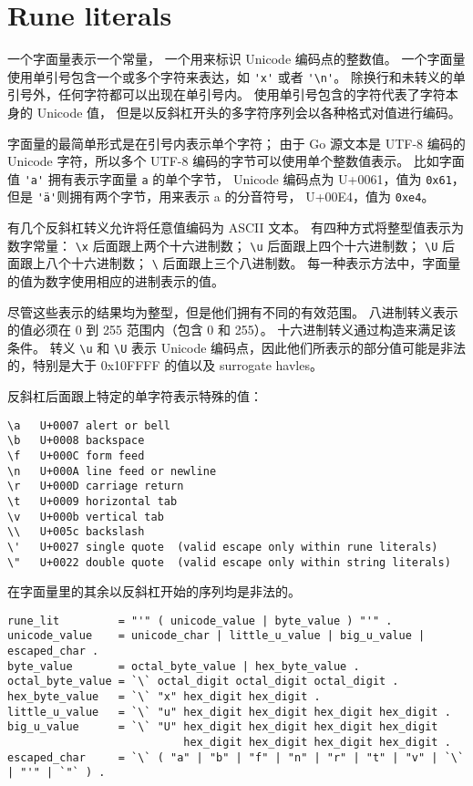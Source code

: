 

\section{Rune literals}
一个\rune{}字面量表示一个\rune{}常量，
一个用来标识 Unicode 编码点的整数值。
一个\rune{}字面量使用单引号包含一个或多个字符来表达，如 \lstinline|'x'| 或者 \lstinline|'\n'|。
除换行和未转义的单引号外，任何字符都可以出现在单引号内。
使用单引号包含的字符代表了字符本身的 Unicode 值，
但是以反斜杠开头的多字符序列会以各种格式对值进行编码。

\rune{}字面量的最简单形式是在引号内表示单个字符；
由于 Go 源文本是 UTF-8 编码的 Unicode 字符，所以多个 UTF-8 编码的字节可以使用单个整数值表示。
比如字面值 \lstinline|'a'| 拥有表示字面量 \lstinline|a| 的单个字节，
Unicode 编码点为 U+0061，值为 \lstinline|0x61|，但是 \lstinline|'ä'|则拥有两个字节，用来表示 a 的分音符号，
U+00E4，值为 \lstinline|0xe4|。

有几个反斜杠转义允许将任意值编码为 ASCII 文本。
有四种方式将整型值表示为数字常量：
\lstinline|\x| 后面跟上两个十六进制数；
\lstinline|\u| 后面跟上四个十六进制数；
\lstinline|\U| 后面跟上八个十六进制数；
\lstinline|\|  后面跟上三个八进制数。
每一种表示方法中，字面量的值为数字使用相应的进制表示的值。

尽管这些表示的结果均为整型，但是他们拥有不同的有效范围。
八进制转义表示的值必须在 0 到 255 范围内（包含 0 和 255）。
十六进制转义通过构造来满足该条件。%
转义 \lstinline|\u| 和 \lstinline|\U| 表示 Unicode 编码点，因此他们所表示的部分值可能是非法的，特别是大于 0x10FFFF 的值以及 surrogate havles。

反斜杠后面跟上特定的单字符表示特殊的值：
\begin{lstlisting}
\a   U+0007 alert or bell
\b   U+0008 backspace
\f   U+000C form feed
\n   U+000A line feed or newline
\r   U+000D carriage return
\t   U+0009 horizontal tab
\v   U+000b vertical tab
\\   U+005c backslash
\'   U+0027 single quote  (valid escape only within rune literals)
\"   U+0022 double quote  (valid escape only within string literals)
\end{lstlisting}

在\rune{}字面量里的其余以反斜杠开始的序列均是非法的。
\begin{lstlisting}[style=EBNF]
rune_lit         = "'" ( unicode_value | byte_value ) "'" .
unicode_value    = unicode_char | little_u_value | big_u_value | escaped_char .
byte_value       = octal_byte_value | hex_byte_value .
octal_byte_value = `\` octal_digit octal_digit octal_digit .
hex_byte_value   = `\` "x" hex_digit hex_digit .
little_u_value   = `\` "u" hex_digit hex_digit hex_digit hex_digit .
big_u_value      = `\` "U" hex_digit hex_digit hex_digit hex_digit
                           hex_digit hex_digit hex_digit hex_digit .
escaped_char     = `\` ( "a" | "b" | "f" | "n" | "r" | "t" | "v" | `\` | "'" | `"` ) .
\end{lstlisting}

